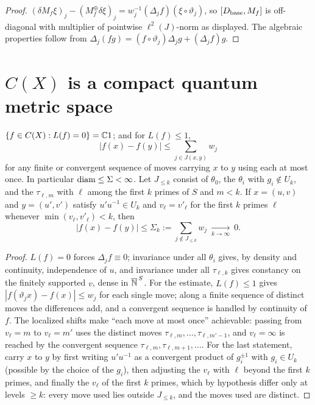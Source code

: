 \begin{proof}
$(\delta M_f\xi)_j-(M_f^\oplus\delta\xi)_j=w_j^{-1}(\Delta_jf)(\xi\circ\vartheta_j)$, so
$[D_{\mathrm{base}},M_f]$ is off-diagonal with multiplier of pointwise $\ell^2(J)$-norm as displayed. The
algebraic properties follow from
$\Delta_j(fg)=(f\circ\vartheta_j)\Delta_jg+(\Delta_jf)g$.
\end{proof}

\section{$C(X)$ is a compact quantum metric space}

\begin{lemma}\label{IV:lem:kernelpath}
$\{f\in C(X):L(f)=0\}=\mathbb{C}1$; and for $L(f)\le1$,
\[
|f(x)-f(y)|\le\sum_{j\in J(x,y)}w_j
\]
for any finite or convergent sequence of moves carrying $x$ to $y$ using each at most
once. In particular $\operatorname{diam}\le\Sigma<\infty$. Let $J_{\le k}$ consist of $\theta_0$, the
$\theta_i$ with $g_i\notin U_k$, and the $\tau_{\ell,m}$ with $\ell$ among the first $k$
primes of $S$ and $m<k$. If $x=(u,v)$ and $y=(u',v')$ satisfy $u'u^{-1}\in U_k$ and
$v_\ell=v'_\ell$ for the first $k$ primes $\ell$ whenever $\min(v_\ell,v'_\ell)<k$, then
\[
|f(x)-f(y)|\le\Sigma_k:=\sum_{j\notin J_{\le k}}w_j\ \xrightarrow[k\to\infty]{}\ 0 .
\]
\end{lemma}

\begin{proof}
$L(f)=0$ forces $\Delta_jf\equiv0$; invariance under all $\theta_i$ gives, by density and
continuity, independence of $u$, and invariance under all $\tau_{\ell,k}$ gives constancy on
the finitely supported $v$, dense in $\overline{\mathbb{N}}^{\,S}$. For the estimate,
$L(f)\le1$ gives $|f(\vartheta_jx)-f(x)|\le w_j$ for each single move; along a finite
sequence of distinct moves the differences add, and a convergent sequence is handled by
continuity of $f$. The localized shifts make ``each move at most once'' achievable: passing
from $v_\ell=m$ to $v_\ell=m'$ uses the distinct moves $\tau_{\ell,m},\dots,\tau_{\ell,m'-1}$,
and $v_\ell=\infty$ is reached by the convergent sequence $\tau_{\ell,m},\tau_{\ell,m+1},\dots$.
For the last statement, carry $x$ to $y$ by first writing $u'u^{-1}$ as a convergent
product of $g_i^{\pm1}$ with $g_i\in U_k$ (possible by the choice of the $g_i$), then
adjusting the $v_\ell$ with $\ell$ beyond the first $k$ primes, and finally the $v_\ell$ of
the first $k$ primes, which by hypothesis differ only at levels $\ge k$: every move used
lies outside $J_{\le k}$, and the moves used are distinct.
\end{proof}

